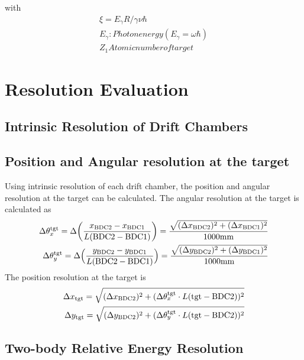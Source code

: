 with 
\begin{align}
    \xi=E_{\gamma}R/\gamma \nu \hbar\\
    E_{\gamma}: Photon energy( E_{\gamma}=\omega\hbar )\\
    Z_{1} Atomic number of target
\end{align}


\chapter{Resolution Evaluation}
\section{Intrinsic Resolution of Drift Chambers}

\section{Position and Angular resolution at the target}
Using intrinsic resolution of each drift chamber, the position and angular resolution at the target can be calculated. The angular resolution at the target is calculated as
\begin{align}
    \Delta \theta_x^{\text{tgt}} = \Delta \bigg( \frac{x_{\text{BDC2}} - x_{\text{BDC1}}}{L(\text{BDC2} - \text{BDC1})} \bigg) 
    = \frac{\sqrt{(\Delta x_{\text{BDC2}})^2 + (\Delta x_{\text{BDC1}})^2}}{1000 \text{mm}} \\ \notag
    \Delta \theta^{\text{tgt}}_y = \Delta \Big( \frac{y_{\text{BDC2}} - y_{\text{BDC1}}}{L(\text{BDC2} - \text{BDC1})} \Big) 
    = \frac{\sqrt{(\Delta y_{\text{BDC2}})^2 + (\Delta y_{\text{BDC1}})^2}}{1000 \text{mm}}
\end{align}
The position resolution at the target is
\begin{align}
    \Delta x_{\text{tgt}} = \sqrt{(\Delta x_{\text{BDC2}})^2 + (\Delta \theta_x^{\text{tgt}} \cdot L(\text{tgt} - \text{BDC2}))^2} \\ \notag
    \Delta y_{\text{tgt}} = \sqrt{(\Delta y_{\text{BDC2}})^2 + (\Delta \theta_y^{\text{tgt}} \cdot L(\text{tgt} - \text{BDC2}))^2}
\end{align}


\section{Two-body Relative Energy Resolution}


